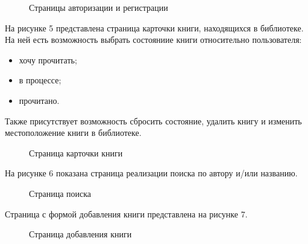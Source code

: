 \documentclass[12pt]{article}
\begin{document}
\begin{figure}[H]
	\caption{Страницы авторизации и регистрации}
	\label{fig:image}
\end{figure}





На рисунке 5 представлена страница карточки книги, находящихся в библиотеке. На ней есть возможность выбрать состояниие книги относительно пользователя:
\begin{itemize}
	\item хочу прочитать;
	\item в процессе;
	\item прочитано.
\end{itemize}

Также присутствует возможность сбросить состояние, удалить книгу и изменить местоположение книги в библиотеке. 

\begin{figure}[H]
	\caption{Страница карточки книги}
	\label{fig:image}
\end{figure}

На рисунке 6 показана страница реализации поиска по автору и/или названию.

\begin{figure}[H]
	\caption{Страница поиска}
	\label{fig:image}
\end{figure}

Страница с формой добавления книги представлена на рисунке 7. 

\begin{figure}[H]
	\caption{Страница добавления книги}
	\label{fig:image}
\end{figure}
\end{document}
